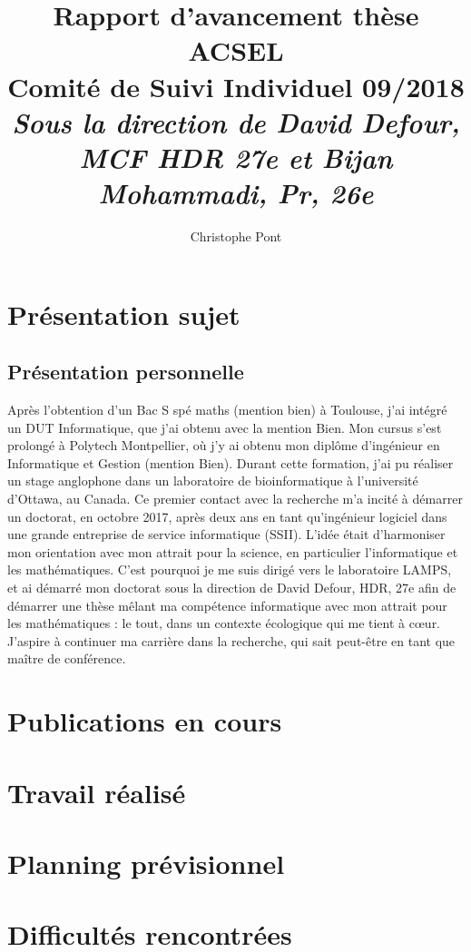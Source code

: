 \documentclass[a4paper,11pt]{report}
\title{%
  Rapport d'avancement thèse ACSEL \\
  \large Comité de Suivi Individuel 09/2018 \\ %
  \large \textit{Sous la direction de David Defour, MCF HDR 27e et Bijan Mohammadi, Pr, 26e}}
\author{Christophe Pont}
\begin{document}
\maketitle
\tableofcontents

\begin{abstract}
\end{abstract}

\chapter{Présentation sujet}

\section{Présentation personnelle}
Après l’obtention d’un Bac S spé maths (mention bien) à Toulouse, j’ai intégré un DUT Informatique, que j'ai obtenu avec la mention Bien. Mon cursus s’est prolongé à Polytech Montpellier, où j’y ai obtenu mon diplôme d’ingénieur en Informatique et Gestion (mention Bien). Durant cette formation, j’ai pu réaliser un stage anglophone dans un laboratoire de bioinformatique à l’université d’Ottawa, au Canada. Ce premier contact avec la recherche m’a incité à démarrer un doctorat, en octobre 2017, après deux ans en tant qu’ingénieur logiciel dans une grande entreprise de service informatique (SSII). L’idée était d’harmoniser mon orientation avec mon attrait pour la science, en particulier l’informatique et les mathématiques. C’est pourquoi je me suis dirigé vers le laboratoire LAMPS, et ai démarré mon doctorat sous la direction de David Defour, HDR, 27e afin de démarrer une thèse mêlant ma compétence informatique avec mon attrait pour les mathématiques : le tout, dans un contexte écologique qui me tient à cœur. J’aspire à continuer ma carrière dans la recherche, qui sait peut-être en tant que maître de conférence.




\chapter{Publications en cours}
\chapter{Travail réalisé}
\chapter{Planning prévisionnel}
\chapter{Difficultés rencontrées}
\end{document}
